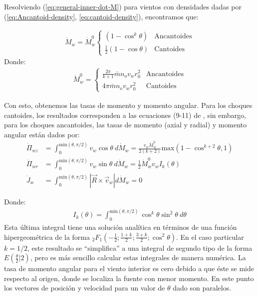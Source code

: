 Resolviendo (\ref{eq:general-inner-dot-M}) para vientos con densidades dadas por (\ref{eq:Ancantoid-density}, \ref{eq:cantoid-density}), encontramos que:

\begin{align}
  \dot{M}_w = \dot{M}^0_w\left\lbrace
  \begin{array}{lr}
    \left(1 - \cos^k\theta\right) & \mathrm{Ancantoides} \\
    \frac{1}{2} \left(1 - \cos\theta\right) & \mathrm{Cantoides}
  \end{array}\right. \label{eq:inner-dot-M}
\end{align}
Donde:
\begin{align}
  \dot{M}^0_w = \left\lbrace
  \begin{array}{lr}
    \frac{2\pi}{k+1}\bar{m}n_o v_w r_0^2 & \mathrm{Ancantoides} \\
    4\pi \bar{m}n_o v_w r_0^2 & \mathrm{Cantoides}
  \end{array}\right.
\end{align}

Con esto, obtenemos las tasas de momento y momento angular. Para los choques cantoides, los resultados corresponden a las ecuaciones (9-11) de \CRW{}, sin embargo, para los choques ancantoides, las tasas de momento (axial y radial) y momento angular están dados por:
\begin{align}
  \dot{\Pi}_{wz} &= \int^{\mathrm{min}(\theta, \pi/2)}_0 v_w\cos\theta~d\dot{M}_w = \frac{v_w \dot{M}^0_w}{2\left(k+2\right)}\mathrm{max}\left(1 - \cos^{k+2}\theta, 1\right) \label{eq:Pi-wz} \\
  \dot{\Pi}_{wr} &= \int^{\mathrm{min}(\theta, \pi/2)}_0 v_w\sin\theta~d\dot{M}_w = \frac{1}{2}\dot{M}^0_w v_w I_k(\theta) \\
  \dot{J}_w &= \int^{\mathrm{min}(\theta, \pi/2)}_0 |\vec{R} \times \vec{v}_w|d\dot{M}_w = 0 \label{eq:inner-dot-J}
\end{align}

Donde:
\begin{align}
  I_k(\theta) = \int^{\mathrm{min}(\theta, \pi/2)}_0 \cos^k\theta \sin^2\theta~d\theta \label{eq:Ikt}
\end{align}
 Esta última integral tiene una solución analítica en términos de una función hipergeométrica de la forma ${}_2F_1\left(-\frac{1}{2}; \frac{1+k}{2}; \frac{3+k}{2}; \cos^2\theta\right)$. En el caso particular $k=1/2$, este resultado se ``simplifica'' a una integral de segundo tipo de la forma $E\left(\frac{\theta}{2} | 2\right)$, pero es más sencillo calcular estas integrales de manera numérica. La tasa de momento angular para el viento interior es cero debido a que éste se mide respecto al origen, donde se localiza la fuente con menor momento. En este punto los vectores de posición y velocidad para un valor de $\theta$ dado son paralelos.

